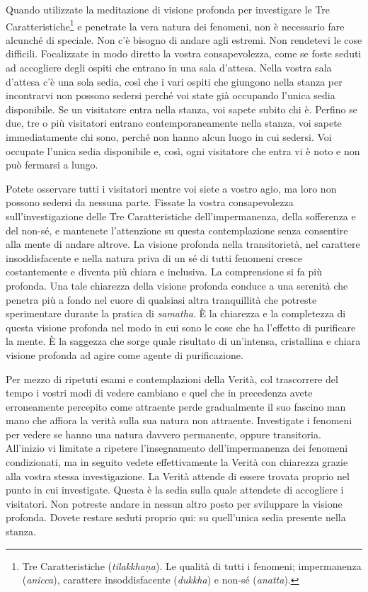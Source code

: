 Quando utilizzate la meditazione di visione profonda per investigare le
Tre Caratteristiche\footnote{Tre Caratteristiche (\emph{tilakkhaṇa}). Le
  qualità di tutti i fenomeni; impermanenza (\emph{anicca}), carattere
  insoddisfacente (\emph{dukkha}) e non-sé (\emph{anatta}).} e penetrate
la vera natura dei fenomeni, non è necessario fare alcunché di speciale.
Non c'è bisogno di andare agli estremi. Non rendetevi le cose difficili.
Focalizzate in modo diretto la vostra consapevolezza, come se foste
seduti ad accogliere degli ospiti che entrano in una sala d'attesa.
Nella vostra sala d'attesa c'è una sola sedia, così che i vari ospiti
che giungono nella stanza per incontrarvi non possono sedersi perché voi
state già occupando l'unica sedia disponibile. Se un visitatore entra
nella stanza, voi sapete subito chi è. Perfino se due, tre o più
visitatori entrano contemporaneamente nella stanza, voi sapete
immediatamente chi sono, perché non hanno alcun luogo in cui sedersi.
Voi occupate l'unica sedia disponibile e, così, ogni visitatore che
entra vi è noto e non può fermarsi a lungo.

Potete osservare tutti i visitatori mentre voi siete a vostro agio, ma
loro non possono sedersi da nessuna parte. Fissate la vostra
consapevolezza sull'investigazione delle Tre Caratteristiche
dell'impermanenza, della sofferenza e del non-sé, e mantenete
l'attenzione su questa contemplazione senza consentire alla mente di
andare altrove. La visione profonda nella transitorietà, nel carattere
insoddisfacente e nella natura priva di un sé di tutti fenomeni cresce
costantemente e diventa più chiara e inclusiva. La comprensione si fa
più profonda. Una tale chiarezza della visione profonda conduce a una
serenità che penetra più a fondo nel cuore di qualsiasi altra
tranquillità che potreste sperimentare durante la pratica di
\emph{samatha}. È la chiarezza e la completezza di questa visione
profonda nel modo in cui sono le cose che ha l'effetto di purificare la
mente. È la saggezza che sorge quale risultato di un'intensa,
cristallina e chiara visione profonda ad agire come agente di
purificazione.

Per mezzo di ripetuti esami e contemplazioni della Verità, col
trascorrere del tempo i vostri modi di vedere cambiano e quel che in
precedenza avete erroneamente percepito come attraente perde
gradualmente il suo fascino man mano che affiora la verità sulla sua
natura non attraente. Investigate i fenomeni per vedere se hanno una
natura davvero permanente, oppure transitoria. All'inizio vi limitate a
ripetere l'insegnamento dell'impermanenza dei fenomeni condizionati, ma
in seguito vedete effettivamente la Verità con chiarezza grazie alla
vostra stessa investigazione. La Verità attende di essere trovata
proprio nel punto in cui investigate. Questa è la sedia sulla quale
attendete di accogliere i visitatori. Non potreste andare in nessun
altro posto per sviluppare la visione profonda. Dovete restare seduti
proprio qui: su quell'unica sedia presente nella stanza.

